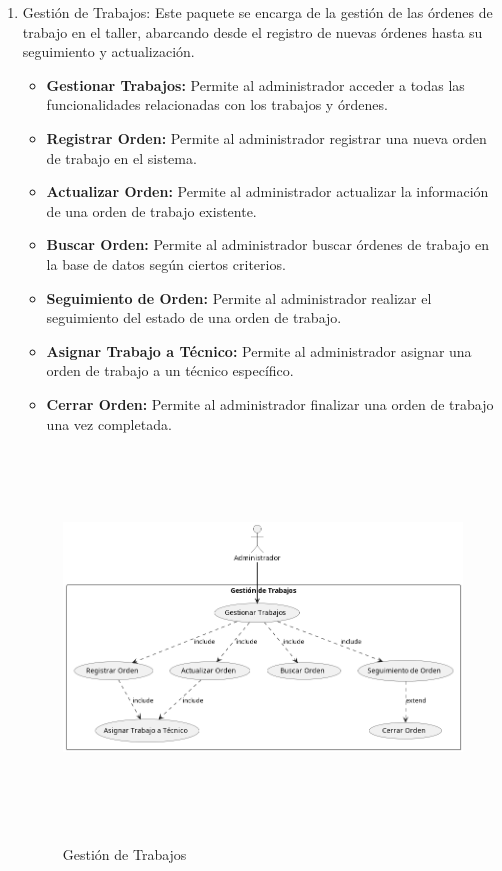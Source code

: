 \begin{enumerate}
	\item Gestión de Trabajos:
	Este paquete se encarga de la gestión de las órdenes de trabajo en el taller, abarcando desde el registro de nuevas órdenes hasta su seguimiento y actualización.
	\begin{itemize}
		\item \textbf{Gestionar Trabajos:} Permite al administrador acceder a todas las funcionalidades relacionadas con los trabajos y órdenes.
		\item \textbf{Registrar Orden:} Permite al administrador registrar una nueva orden de trabajo en el sistema.
		\item \textbf{Actualizar Orden:} Permite al administrador actualizar la información de una orden de trabajo existente.
		\item \textbf{Buscar Orden:} Permite al administrador buscar órdenes de trabajo en la base de datos según ciertos criterios.
		\item \textbf{Seguimiento de Orden:} Permite al administrador realizar el seguimiento del estado de una orden de trabajo.
		\item \textbf{Asignar Trabajo a Técnico:} Permite al administrador asignar una orden de trabajo a un técnico específico.
		\item \textbf{Cerrar Orden:} Permite al administrador finalizar una orden de trabajo una vez completada.
	\end{itemize}
	\begin{figure}[H]
		\centering
		\caption{Gestión de Trabajos}
		\includegraphics[width=12cm, height=10cm]{imagenes/cap4/casosUso/GestionTrabajos.png}
		\label{fig:Caso4}
	\end{figure}
	

\end{enumerate}
